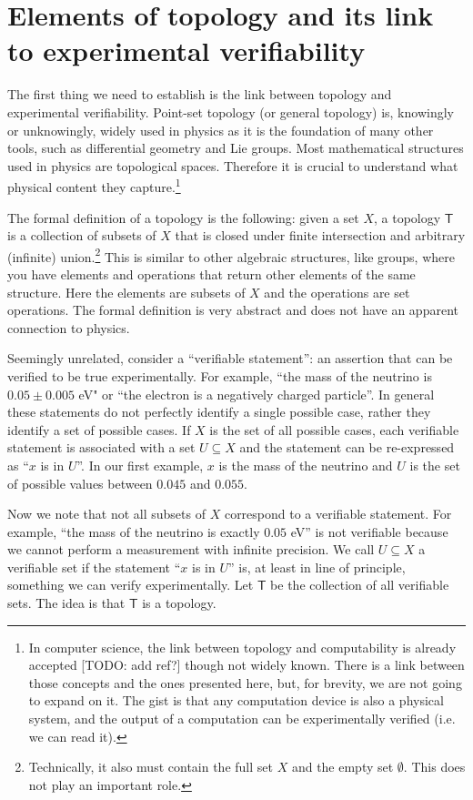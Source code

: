\documentclass[12pt]{iopart}
\begin{document}
\section{Elements of topology and its link to experimental verifiability}

The first thing we need to establish is the link between topology and experimental verifiability. Point-set topology (or general topology) is, knowingly or unknowingly, widely used in physics as it is the foundation of many other tools, such as differential geometry and Lie groups. Most mathematical structures used in physics are topological spaces. Therefore it is crucial to understand what physical content they capture.\footnote{In computer science, the link between topology and computability is already accepted [TODO: add ref?] though not widely known. There is a link between those concepts and the ones presented here, but, for brevity, we are not going to expand on it. The gist is that any computation device is also a physical system, and the output of a computation can be experimentally verified (i.e. we can read it).}

The formal definition of a topology is the following: given a set $X$, a topology $\mathsf{T}$ is a collection of subsets of $X$ that is closed under finite intersection and arbitrary (infinite) union.\footnote{Technically, it also must contain the full set $X$ and the empty set $\emptyset$. This does not play an important role.} This is similar to other algebraic structures, like groups, where you have elements and operations that return other elements of the same structure. Here the elements are subsets of $X$ and the operations are set operations. The formal definition is very abstract and does not have an apparent connection to physics.

Seemingly unrelated, consider a ``verifiable statement'': an assertion that can be verified to be true experimentally. For example, ``the mass of the neutrino is $0.05 \pm 0.005$ eV" or ``the electron is a negatively charged particle''. In general these statements do not perfectly identify a single possible case, rather they identify a set of possible cases. If $X$ is the set of all possible cases, each verifiable statement is associated with a set $U \subseteq X$ and the statement can be re-expressed as ``$x$ is in $U$''. In our first example, $x$ is the mass of the neutrino and $U$ is the set of possible values between $0.045$ and $0.055$.

Now we note that not all subsets of $X$ correspond to a verifiable statement. For example, ``the mass of the neutrino is exactly $0.05$ eV'' is not verifiable because we cannot perform a measurement with infinite precision. We call $U \subseteq X$ a verifiable set if the statement ``$x$ is in $U$'' is, at least in line of principle, something we can verify experimentally. Let $\mathsf{T}$ be the collection of all verifiable sets. The idea is that $\mathsf{T}$ is a topology.
\end{document}
